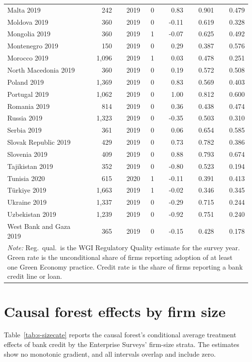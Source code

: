 \documentclass[12pt]{article}
\begin{document}
{\begin{longtable}{p{3.4cm}rrrrrr}
Malta 2019 & 242 & 2019 & 0 & 0.83 & 0.901 & 0.479 \\
Moldova 2019 & 360 & 2019 & 0 & -0.11 & 0.619 & 0.328 \\
Mongolia 2019 & 360 & 2019 & 1 & -0.07 & 0.625 & 0.492 \\
Montenegro 2019 & 150 & 2019 & 0 & 0.29 & 0.387 & 0.576 \\
Morocco 2019 & 1{,}096 & 2019 & 1 & 0.03 & 0.478 & 0.251 \\
North Macedonia 2019 & 360 & 2019 & 0 & 0.19 & 0.572 & 0.508 \\
Poland 2019 & 1{,}369 & 2019 & 0 & 0.83 & 0.569 & 0.403 \\
Portugal 2019 & 1{,}062 & 2019 & 0 & 1.00 & 0.812 & 0.600 \\
Romania 2019 & 814 & 2019 & 0 & 0.36 & 0.438 & 0.474 \\
Russia 2019 & 1{,}323 & 2019 & 0 & -0.35 & 0.503 & 0.310 \\
Serbia 2019 & 361 & 2019 & 0 & 0.06 & 0.654 & 0.585 \\
Slovak Republic 2019 & 429 & 2019 & 0 & 0.73 & 0.782 & 0.386 \\
Slovenia 2019 & 409 & 2019 & 0 & 0.88 & 0.793 & 0.674 \\
Tajikistan 2019 & 352 & 2019 & 0 & -0.80 & 0.523 & 0.194 \\
Tunisia 2020 & 615 & 2020 & 1 & -0.11 & 0.391 & 0.413 \\
Türkiye 2019 & 1{,}663 & 2019 & 1 & -0.02 & 0.346 & 0.345 \\
Ukraine 2019 & 1{,}337 & 2019 & 0 & -0.29 & 0.715 & 0.244 \\
Uzbekistan 2019 & 1{,}239 & 2019 & 0 & -0.92 & 0.751 & 0.240 \\
West Bank and Gaza 2019 & 365 & 2019 & 0 & -0.15 & 0.428 & 0.178 \\
\bottomrule
\multicolumn{7}{p{13.5cm}}{\footnotesize \emph{Note:} Reg.\ qual.\ is the WGI Regulatory Quality estimate for the survey year. Green rate is the unconditional share of firms reporting adoption of at least one Green Economy practice. Credit rate is the share of firms reporting a bank credit line or loan.}
\end{longtable}
}

\section{Causal forest effects by firm size}
\label{sec:s-sizecate}

Table~\ref{tab:s-sizecate} reports the causal forest's conditional average treatment effects of bank credit by the Enterprise Surveys' firm-size strata. The estimates show no monotonic gradient, and all intervals overlap and include zero.
\end{document}
